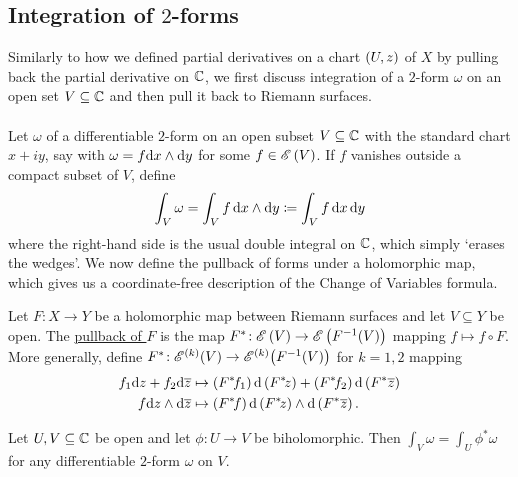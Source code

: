 \documentclass[../Moduli_Spaces_of_Riemann_Surfaces.tex]{subfiles}
\begin{document}
    \subsection{Integration of $2$-forms}
    Similarly to how we defined partial derivatives on a chart $\left(U,z\right)$ of $X$ by pulling back the partial derivative on $\mathbb{C}$, we first discuss integration of a $2$-form $\omega$ on an open set $V\subseteq\mathbb{C}$ and then pull it back to Riemann surfaces.\\\ \\
    Let $\omega$ of a differentiable $2$-form on an open subset $V\subseteq\mathbb{C}$ with the standard chart $x+iy$, say with $\omega=f\mathrm{d} x\wedge\mathrm{d} y$ for some $f\in\mathscr{E}\left(V\right)$. If $f$ vanishes outside a compact subset of $V$, define
    \begin{equation*}
        \int_V\omega=\int_Vf\,\mathrm{d} x\wedge\mathrm{d} y\coloneqq\int_Vf\,\mathrm{d} x\,\mathrm{d} y
    \end{equation*}
    where the right-hand side is the usual double integral on $\mathbb{C}$, which simply `erases the wedges'. We now define the pullback of forms under a holomorphic map, which gives us a coordinate-free description of the Change of Variables formula.
    \begin{definition}
        Let $F:X\to Y$ be a holomorphic map between Riemann surfaces and let $V\subseteq Y$ be open. The \ul{pullback of $F$} is the map $F^\ast\!:\mathscr{E}\left(V\right)\to\mathscr{E}\left(F^{-1}\!\left(V\right)\right)$ mapping $f\mapsto f\circ F$. More generally, define $F^\ast\!:\mathscr{E}^{\left(k\right)}\!\left(V\right)\to\mathscr{E}^{\left(k\right)}\!\left(F^{-1}\!\left(V\right)\right)$ for $k=1,2$ mapping
        \begin{equation*}
            \begin{aligned}
                f_1\mathrm{d} z+f_2\mathrm{d}\overline{z}&\mapsto\left(F^\ast\!f_1\right)\mathrm{d}\left(F^\ast\!z\right)+\left(F^\ast\!f_2\right)\mathrm{d}\left(F^\ast\overline{z}\right) \\
                f\mathrm{d} z\wedge\mathrm{d}\overline{z}&\mapsto\left(F^\ast\!f\right)\mathrm{d}\left(F^\ast\!z\right)\wedge\mathrm{d}\left(F^\ast\overline{z}\right).
            \end{aligned}
        \end{equation*}
    \end{definition}
    \begin{proposition}\label{CC:prp:change_of_variables_in_C}
        Let $U,V\subseteq\mathbb{C}$ be open and let $\phi:U\to V$ be biholomorphic. Then $\int_V\omega=\int_U\phi^\ast\omega$ for any differentiable $2$-form $\omega$ on $V$.
    \end{proposition}
\end{document}
